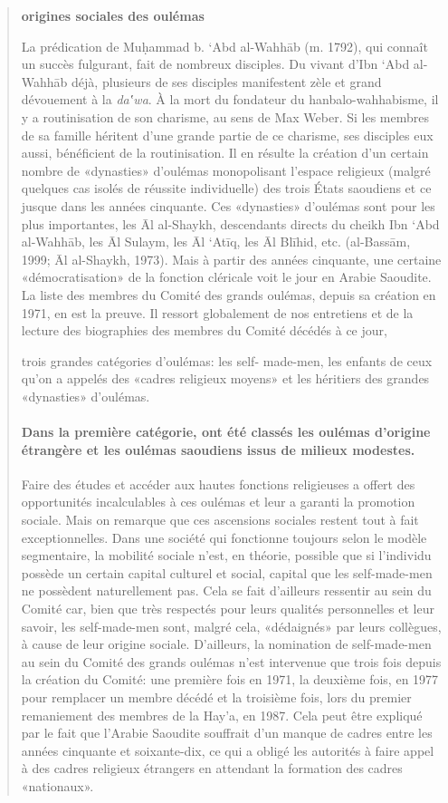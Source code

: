 \begin{quote}
\textbf{origines sociales des oulémas}

La prédication de Muḥammad b. `Abd al-Wahhāb (m. 1792), qui connaît un
succès fulgurant, fait de nombreux disciples. Du vivant d'Ibn `Abd
al-Wahhāb déjà, plusieurs de ses disciples manifestent zèle et grand
dévouement à la \emph{da‛wa}. À la mort du fondateur du
hanbalo-wahhabisme, il y a routinisation de son charisme, au sens de Max
Weber. Si les membres de sa famille héritent d'une grande partie de ce
charisme, ses disciples eux aussi, bénéficient de la routinisation. Il
en résulte la création d'un certain nombre de «dynasties» d'oulémas
monopolisant l'espace religieux (malgré quelques cas isolés de réussite
individuelle) des trois États saoudiens et ce jusque dans les années
cinquante. Ces «dynasties» d'oulémas sont pour les plus importantes, les
Āl al-Shaykh, descendants directs du cheikh Ibn `Abd al-Wahhāb, les Āl
Sulaym, les Āl `Atīq, les Āl Blīhid, etc. (al-Bassām, 1999; Āl
al-Shaykh, 1973). Mais à partir des années cinquante, une certaine
«démocratisation» de la fonction cléricale voit le jour en Arabie
Saoudite. La liste des membres du Comité des grands oulémas, depuis sa
création en 1971, en est la preuve. Il ressort globalement de nos
entretiens et de la lecture des biographies des membres du Comité
décédés à ce jour, 
\begin{Synthesis}
trois grandes catégories d'oulémas: les self-
made-men, les enfants de ceux qu'on a appelés des «cadres religieux
moyens» et les héritiers des grandes «dynasties» d'oulémas.
\end{Synthesis}

 \paragraph{Dans la première catégorie, ont été classés les oulémas d'origine
étrangère et les oulémas saoudiens issus de milieux modestes.} Faire des
études et accéder aux hautes fonctions religieuses a offert des
opportunités incalculables à ces oulémas et leur a garanti la promotion
sociale. Mais on remarque que ces ascensions sociales restent tout à
fait exceptionnelles. Dans une société qui fonctionne toujours selon le
modèle segmentaire, la mobilité sociale n'est, en théorie, possible que
si l'individu possède un certain capital culturel et social, capital que
les self-made-men ne possèdent naturellement pas. Cela se fait
d'ailleurs ressentir au sein du Comité car, bien que très respectés pour
leurs qualités personnelles et leur savoir, les self-made-men sont,
malgré cela, «dédaignés» par leurs collègues, à cause de leur origine
sociale. D'ailleurs, la nomination de self-made-men au sein du Comité
des grands oulémas n'est intervenue que trois fois depuis la création du
Comité: une première fois en 1971, la deuxième fois, en 1977 pour
remplacer un membre décédé et la troisième fois, lors du premier
remaniement des membres de la Hay'a, en 1987. Cela peut être expliqué
par le fait que l'Arabie Saoudite souffrait d'un manque de cadres entre
les années cinquante et soixante-dix, ce qui a obligé les autorités à
faire appel à des cadres religieux étrangers en attendant la formation
des cadres «nationaux».


\end{quote}

